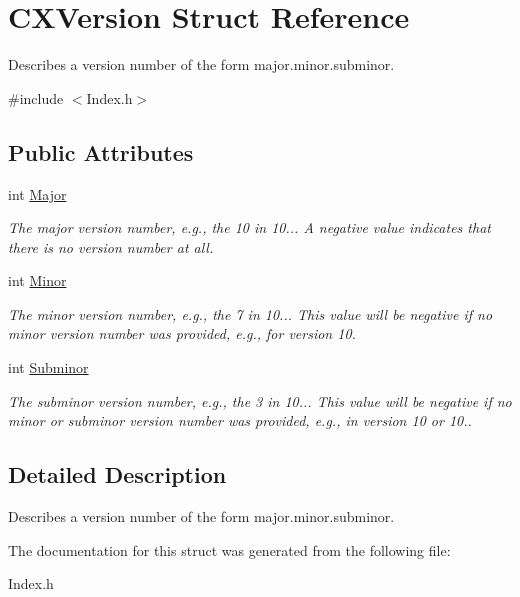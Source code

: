 \hypertarget{structCXVersion}{}\section{C\+X\+Version Struct Reference}
\label{structCXVersion}


Describes a version number of the form major.\+minor.\+subminor.  




{\ttfamily \#include $<$Index.\+h$>$}

\subsection*{Public Attributes}
\begin{DoxyCompactItemize}
\item 
\mbox{\label{structCXVersion_a04650af435ba5d89c7b2254b3b21eaeb}} 
int \mbox{\hyperlink{structCXVersion_a04650af435ba5d89c7b2254b3b21eaeb}{Major}}
\begin{DoxyCompactList}\small\item\em The major version number, e.\+g., the \textquotesingle{}10\textquotesingle{} in \textquotesingle{}10..\textquotesingle{}. A negative value indicates that there is no version number at all. \end{DoxyCompactList}\item 
\mbox{\label{structCXVersion_aff74ef39e4cbd8ec7b98452f3a044335}} 
int \mbox{\hyperlink{structCXVersion_aff74ef39e4cbd8ec7b98452f3a044335}{Minor}}
\begin{DoxyCompactList}\small\item\em The minor version number, e.\+g., the \textquotesingle{}7\textquotesingle{} in \textquotesingle{}10..\textquotesingle{}. This value will be negative if no minor version number was provided, e.\+g., for version \textquotesingle{}10\textquotesingle{}. \end{DoxyCompactList}\item 
\mbox{\label{structCXVersion_a1c6a879a09c67286c0730c926ae58ad9}} 
int \mbox{\hyperlink{structCXVersion_a1c6a879a09c67286c0730c926ae58ad9}{Subminor}}
\begin{DoxyCompactList}\small\item\em The subminor version number, e.\+g., the \textquotesingle{}3\textquotesingle{} in \textquotesingle{}10..\textquotesingle{}. This value will be negative if no minor or subminor version number was provided, e.\+g., in version \textquotesingle{}10\textquotesingle{} or \textquotesingle{}10.\textquotesingle{}. \end{DoxyCompactList}\end{DoxyCompactItemize}


\subsection{Detailed Description}
Describes a version number of the form major.\+minor.\+subminor. 

The documentation for this struct was generated from the following file\+:\begin{DoxyCompactItemize}
\item 
Index.\+h\end{DoxyCompactItemize}
